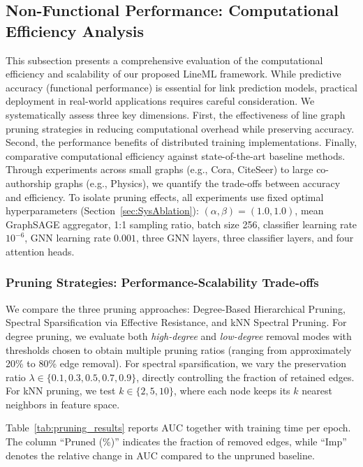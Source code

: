 \documentclass[pdflatex,sn-mathphys-num]{sn-jnl}%
\theoremstyle{thmstyleone}%
\theoremstyle{thmstyletwo}%
\theoremstyle{thmstylethree}%
\theoremstyle{plain} %
\theoremstyle{definition} %
\theoremstyle{remark} %
\theoremstyle{plain} %
\begin{document}
\subsection{Non-Functional Performance: Computational Efficiency Analysis}
This subsection presents a comprehensive evaluation of the computational efficiency and scalability of our proposed LineML framework. 
While predictive accuracy (functional performance) is essential for link prediction models, practical deployment in real-world applications requires careful consideration.
We systematically assess three key dimensions.
First, the effectiveness of line graph pruning strategies in reducing computational overhead while preserving accuracy. 
Second, the performance benefits of distributed training implementations. 
Finally, comparative computational efficiency against state-of-the-art baseline methods. 
Through experiments across small graphs (e.g., Cora, CiteSeer) to large co-authorship graphs (e.g., Physics), we quantify the trade-offs between accuracy and efficiency.
To isolate pruning effects, all experiments use fixed optimal hyperparameters (Section~\ref{sec:SysAblation}): $(\alpha, \beta) = (1.0, 1.0)$, mean GraphSAGE aggregator, 1:1 sampling ratio, batch size 256, classifier learning rate $10^{-6}$, GNN learning rate $0.001$, three GNN layers, three classifier layers, and four attention heads.


\subsubsection{Pruning Strategies: Performance-Scalability Trade-offs}
\label{subsec:pruning_results}



We compare the three pruning approaches: Degree-Based Hierarchical Pruning, Spectral Sparsification via Effective Resistance, and kNN Spectral Pruning. 
For degree pruning, we evaluate both \textit{high-degree} and \textit{low-degree} removal modes with thresholds chosen to obtain multiple pruning ratios (ranging from approximately 20\% to 80\% edge removal). 
For spectral sparsification, we vary the preservation ratio $\lambda \in \{0.1, 0.3, 0.5, 0.7, 0.9\}$, directly controlling the fraction of retained edges. 
For kNN pruning, we test $k \in \{2,5,10\}$, where each node keeps its $k$ nearest neighbors in feature space. 

Table~\ref{tab:pruning_results} reports AUC together with training time per epoch. 
The column ``Pruned (\%)'' indicates the fraction of removed edges, while ``Imp'' denotes the relative change in AUC compared to the unpruned baseline.
\end{document}

